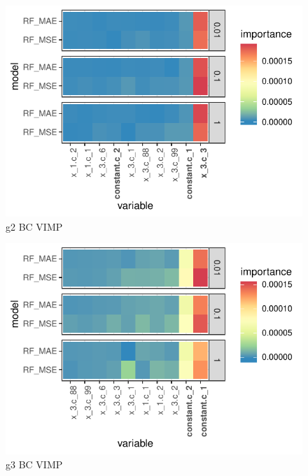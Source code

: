 \documentclass[11pt, a4paper, table]{article}
\begin{document}
\begin{figure}
	\includegraphics[]{../Results/simulation/graphics/simulation_g2_vimp_bc.pdf}
	\caption{g2 BC VIMP}
\end{figure}

\begin{figure}
	\includegraphics[]{../Results/simulation/graphics/simulation_g3_vimp_bc.pdf}
	\caption{g3 BC VIMP}
\end{figure}

\end{document}
